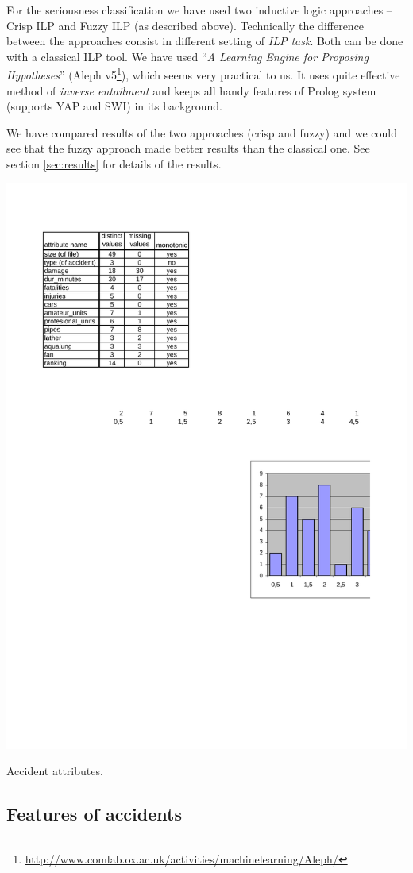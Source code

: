 \documentclass[authoryear,12pt]{elsarticle}
\begin{document}
For the seriousness classification we have used two inductive logic approaches -- Crisp ILP and Fuzzy ILP (as described above). Technically the difference between the approaches consist in different setting of \emph{ILP task}. Both can be done with a classical ILP tool. We have used 
``\emph{A Learning Engine for Proposing Hypotheses}'' (Aleph  v5\footnote{\url{http://www.comlab.ox.ac.uk/activities/machinelearning/Aleph/}}), which seems very practical to us. It uses quite effective method of \emph{inverse entailment} \citep{biblio:InverseEntailment} and keeps all handy features of Prolog system (supports YAP and SWI) in its background.

We have compared results of the two approaches (crisp and fuzzy) and we could see that the fuzzy approach made better results than the classical one. See section \ref{sec:results} for details of the results.



\begin{table}
\centerline{\includegraphics[width=.5\hsize]{img/attributes_description}}
\caption{Accident attributes.}
\label{img:attributes_description}
\end{table}


\subsection{Features of accidents} \label{sec:features}
\end{document}
